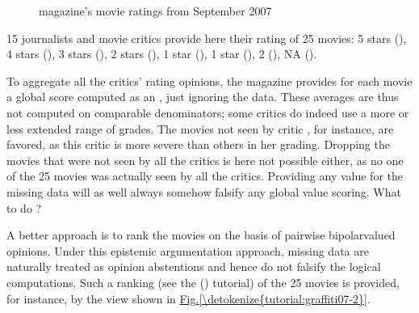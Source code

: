 \documentclass[a4paper,10pt,english]{sphinxhowto}
\let\sphinxpxdimen\pdfpxdimen\else\newdimen\sphinxpxdimen
\begin{document}
\begin{figure}[htbp]
\centering
\capstart

\noindent\sphinxincludegraphics[width=600\sphinxpxdimen]{{graffiti07_1}.png}
\caption{ magazine’s movie ratings from September 2007}\label{\detokenize{tutorial:graffiti07-1}}\end{figure}

15 journalists and movie critics provide here their rating of 25 movies: 5 stars (), 4 stars (), 3 stars (), 2 stars (), 1 star (), \sphinxhyphen{}1 star (), \sphinxhyphen{}2 (), NA ().

To aggregate all the critics’ rating opinions, the  magazine provides for each movie a global score computed as an , just ignoring the  data. These averages are thus not computed on comparable denominators; some critics do indeed use a more or less extended range of grades. The movies not seen by critic , for instance, are favored, as this critic is more severe than others in her grading. Dropping the movies that were not seen by all the critics is here not possible either, as no one of the 25 movies was actually seen by all the critics. Providing any value for the missing data will as well always somehow falsify any global value scoring. What to do ?

A better approach is to rank the movies on the basis of pairwise bipolar\sphinxhyphen{}valued   opinions. Under this epistemic argumentation approach, missing data are naturally treated as opinion abstentions and hence do not falsify the logical computations. Such a ranking (see the {\hyperref[\detokenize{tutorial:ranking-tutorial-label}]{}} () tutorial) of the 25 movies is provided, for instance, by the  view shown in \hyperref[\detokenize{tutorial:graffiti07-2}]{Fig.\@ \ref{\detokenize{tutorial:graffiti07-2}}}.

\begin{sphinxVerbatim}[commandchars=\\\{\}]
                             
                             
\end{sphinxVerbatim}
\end{document}
